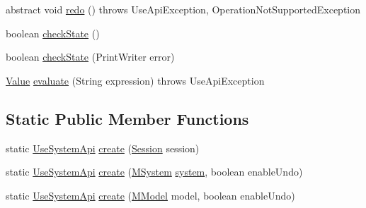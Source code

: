 \begin{DoxyCompactItemize}
abstract void \hyperlink{classorg_1_1tzi_1_1use_1_1api_1_1_use_system_api_ad3f6b40c759bd4c8f45682072cc4fb43}{redo} ()  throws Use\-Api\-Exception, Operation\-Not\-Supported\-Exception
\item 
boolean \hyperlink{classorg_1_1tzi_1_1use_1_1api_1_1_use_system_api_a9f05e2a323a3cea574ed29284bdee545}{check\-State} ()
\item 
boolean \hyperlink{classorg_1_1tzi_1_1use_1_1api_1_1_use_system_api_a77d4f047f742351363f0a754d2be185e}{check\-State} (Print\-Writer error)
\item 
\hyperlink{classorg_1_1tzi_1_1use_1_1uml_1_1ocl_1_1value_1_1_value}{Value} \hyperlink{classorg_1_1tzi_1_1use_1_1api_1_1_use_system_api_a548a6c394615546e597fc78872df82cd}{evaluate} (String expression)  throws Use\-Api\-Exception 
\end{DoxyCompactItemize}
\subsection*{Static Public Member Functions}
\begin{DoxyCompactItemize}
\item 
static \hyperlink{classorg_1_1tzi_1_1use_1_1api_1_1_use_system_api}{Use\-System\-Api} \hyperlink{classorg_1_1tzi_1_1use_1_1api_1_1_use_system_api_a399160c0f81dda9627511cfe4007a5a4}{create} (\hyperlink{classorg_1_1tzi_1_1use_1_1main_1_1_session}{Session} session)
\item 
static \hyperlink{classorg_1_1tzi_1_1use_1_1api_1_1_use_system_api}{Use\-System\-Api} \hyperlink{classorg_1_1tzi_1_1use_1_1api_1_1_use_system_api_aedec74ea4d53ce7b1b7d512334527409}{create} (\hyperlink{classorg_1_1tzi_1_1use_1_1uml_1_1sys_1_1_m_system}{M\-System} \hyperlink{classorg_1_1tzi_1_1use_1_1api_1_1_use_system_api_aabe59f3d91d8ec4b257ec0fce2339a28}{system}, boolean enable\-Undo)
\item 
static \hyperlink{classorg_1_1tzi_1_1use_1_1api_1_1_use_system_api}{Use\-System\-Api} \hyperlink{classorg_1_1tzi_1_1use_1_1api_1_1_use_system_api_aa5e78753d4fa7c40cbaf94f58c66eade}{create} (\hyperlink{classorg_1_1tzi_1_1use_1_1uml_1_1mm_1_1_m_model}{M\-Model} model, boolean enable\-Undo)
\end{DoxyCompactItemize}
